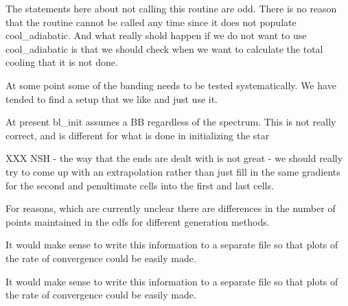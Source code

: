 
\begin{DoxyRefList}
\item[\label{bug__bug000011}%
\Hypertarget{bug__bug000011}%
Global \hyperlink{templates_8h_acbbafed45b10980bb86fe7950daa0604}{adiabatic\+\_\+cooling} (Wind\+Ptr one, double t)]The statements here about not calling this routine are odd. There is no reason that the routine cannot be called any time since it does not populate cool\+\_\+adiabatic. And what really shold happen if we do not want to use cool\+\_\+adiabatic is that we should check when we want to calculate the total cooling that it is not done. 
\item[\label{bug__bug000003}%
\Hypertarget{bug__bug000003}%
Global \hyperlink{templates_8h_a3513a64162c15d3d3d101c3d5ea2367f}{bands\+\_\+init} (int imode, struct xbands $\ast$band)]At some point some of the banding needs to be tested systematically. We have tended to find a setup that we like and just use it. 
\item[\label{bug__bug000045}%
\Hypertarget{bug__bug000045}%
Global \hyperlink{templates_8h_afb47deaf80a8f3a6f07ab91d843d960e}{bl\+\_\+init} (double lum\+\_\+bl, double t\+\_\+bl, double freqmin, double freqmax, int ioniz\+\_\+or\+\_\+final, double $\ast$f)]At present bl\+\_\+init assumes a BB regardless of the spectrum. This is not really correct, and is different for what is done in initializing the star 
\item[\label{bug__bug000007}%
\Hypertarget{bug__bug000007}%
Global \hyperlink{templates_8h_a30c0717640ef307cbe5489ec9ef911f5}{calc\+\_\+cdf\+\_\+gradient} (Cdf\+Ptr cdf)]X\+XX N\+SH -\/ the way that the ends are dealt with is not great -\/ we should really try to come up with an extrapolation rather than just fill in the same gradients for the second and penultimate cells into the first and last cells. 
\item[\label{bug__bug000006}%
\Hypertarget{bug__bug000006}%
File \hyperlink{cdf_8c}{cdf.c} ]For reasons, which are currently unclear there are differences in the number of points maintained in the cdfs for different generation methods. 
\item[\label{bug__bug000032}%
\Hypertarget{bug__bug000032}%
Global \hyperlink{templates_8h_a834b9001d849a521f4dbf7a0dcb0d012}{check\+\_\+convergence} (void)]It would make sense to write this information to a separate file so that plots of the rate of convergence could be easily made. 
\item[\label{bug__bug000032}%
\Hypertarget{bug__bug000032}%
Global \hyperlink{templates_8h_a834b9001d849a521f4dbf7a0dcb0d012}{check\+\_\+convergence} (void)]It would make sense to write this information to a separate file so that plots of the rate of convergence could be easily made. 

\end{DoxyRefList}
